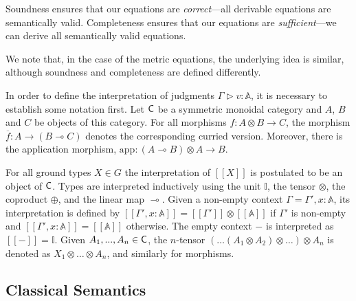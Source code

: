 Soundness ensures that our equations are \emph{correct}—all derivable equations are semantically valid. Completeness ensures that our equations are \emph{sufficient}—we can derive all semantically valid equations.

We note that, in the case of the metric equations, the underlying idea is similar, although soundness and completeness are defined differently.

\vspace{20pt}

In order to define the interpretation of judgments $\Gamma \triangleright v: \mathbb{A}$, it is necessary to establish some notation first. Let $\mathsf{C}$ be a symmetric monoidal category and $A$, $B$ and $C$ be objects of this category. For all morphisms $f: A \otimes B \xrightarrow{} C$, the morphism $\overline{f} : A \xrightarrow{} (B \multimap C)$ denotes the corresponding curried version. Moreover, there is the application morphism, $\text{app}: (A \multimap B) \otimes A \rightarrow B$.  

For all ground types $X \in G$  the interpretation of $[\![X]\!]$  is postulated  to be an object of $\mathsf{C}$. Types are interpreted inductively using the unit $\mathbb{I}$, the tensor $\otimes$, the coproduct $\oplus$, and the linear map $\multimap$. Given a non-empty context $\Gamma=\Gamma',x: \mathbb{A}$, its interpretation is defined by $[\![\Gamma',x: \mathbb{A}]\!] = [\![\Gamma']\!] \otimes [\![\mathbb{A}]\!]$ if $\Gamma'$ is non-empty and $[\![\Gamma',x: \mathbb{A}]\!] = [\![\mathbb{A}]\!]$ otherwise. The empty context $-$ is interpreted as $[\![-]\!] = \mathbb{I}$. Given $A_{1}, . . . ,A_{n} \in \mathsf{C}$, the $n$-tensor $(\ldots (A_1 \otimes A_2) \otimes \ldots ) \otimes A_{n}$ is denoted as $X_1 \otimes \ldots \otimes A_{n}$, and similarly for morphisms. 


\subsection{Classical Semantics}

